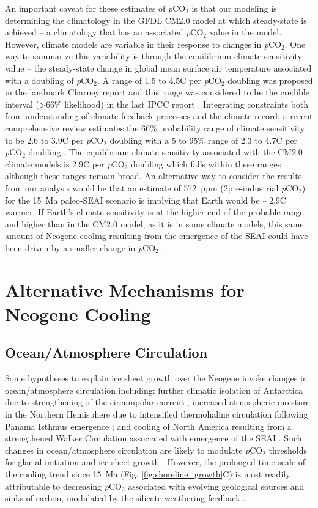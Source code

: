 \documentclass[9pt,twocolumn,twoside,lineno]{pnas-new}
\newcommand{\degreesC}{\textdegree C\xspace}
\newcommand{\pCOtwo}{\textit{p}CO$_{2}$\xspace}
\begin{document}
An important caveat for these estimates of \pCOtwo is that our modeling is determining the climatology in the GFDL CM2.0 model at which steady-state is achieved -- a climatology that has an associated \pCOtwo value in the model. However, climate models are variable in their response to changes in \pCOtwo. One way to summarize this variability is through the equilibrium climate sensitivity value -- the steady-state change in global mean surface air temperature associated with a doubling of \pCOtwo. A range of 1.5 to 4.5\degreesC per \pCOtwo doubling was proposed in the landmark Charney report \cite{Charney1979a} and this range was considered to be the credible interval (\textgreater66\% likelihood) in the last IPCC report \cite{Stocker2013a}. Integrating constraints both from understanding of climate feedback processes and the climate record, a recent comprehensive review estimates the 66\% probability range of climate sensitivity to be 2.6 to 3.9\degreesC per \pCOtwo doubling with a 5 to 95\% range of 2.3 to 4.7\degreesC per \pCOtwo doubling \cite{Sherwood2020a}. The equilibrium climate sensitivity associated with the CM2.0 climate models is 2.9\degreesC per \pCOtwo doubling which falls within these ranges although these ranges remain broad. An alternative way to consider the results from our analysis would be that an estimate of 572~ppm (2\times pre-industrial \pCOtwo) for the 15~Ma paleo-SEAI scenario is implying that Earth would be $\sim$2.9\degreesC warmer. If Earth's climate sensitivity is at the higher end of the probable range and higher than in the CM2.0 model, as it is in some climate models, this same amount of Neogene cooling resulting from the emergence of the SEAI could have been driven by a smaller change in \pCOtwo.

\section*{Alternative Mechanisms for Neogene Cooling}

\subsection*{Ocean/Atmosphere Circulation}

Some hypotheses to explain ice sheet growth over the Neogene invoke changes in ocean/atmosphere circulation including: further climatic isolation of Antarctica due to strengthening of the circumpolar current \cite{Shevenell2004a}; increased atmospheric moisture in the Northern Hemisphere due to intensified thermohaline circulation following Panama Isthmus emergence \cite{Haug1998a}; and cooling of North America resulting from a strengthened Walker Circulation associated with emergence of the SEAI \cite{Molnar2015a}. Such changes in ocean/atmosphere circulation are likely to modulate \pCOtwo thresholds for glacial initiation and ice sheet growth \cite{DeConto2008a}. However, the prolonged time-scale of the cooling trend since 15~Ma (Fig. \ref{fig:shoreline_growth}C) is most readily attributable to decreasing \pCOtwo associated with evolving geological sources and sinks of carbon, modulated by the silicate weathering feedback \cite{Walker1981a, Raymo1991a, Berner1997a, Kump1997a, Berner2001a}.
\end{document}
